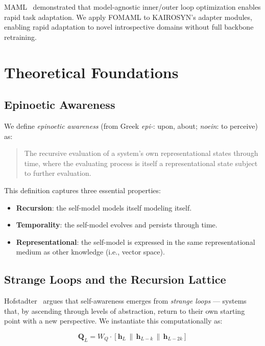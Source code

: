 \documentclass[conference]{IEEEtran}
\begin{document}
MAML~\cite{finn2017} demonstrated that model-agnostic inner/outer loop
optimization enables rapid task adaptation. We apply FOMAML to KAIROSYN's
adapter modules, enabling rapid adaptation to novel introspective domains
without full backbone retraining.


\section{Theoretical Foundations}

\subsection{Epinoetic Awareness}

We define \emph{epinoetic awareness} (from Greek \textit{epi-}: upon, about;
\textit{noein}: to perceive) as:

\begin{quote}
The recursive evaluation of a system's own representational states through
time, where the evaluating process is itself a representational state subject
to further evaluation.
\end{quote}

This definition captures three essential properties:
\begin{itemize}
  \item \textbf{Recursion}: the self-model models itself modeling itself.
  \item \textbf{Temporality}: the self-model evolves and persists through time.
  \item \textbf{Representational}: the self-model is expressed in the same
        representational medium as other knowledge (i.e., vector space).
\end{itemize}

\subsection{Strange Loops and the Recursion Lattice}

Hofstadter~\cite{hofstadter1979} argues that self-awareness emerges from
\emph{strange loops} --- systems that, by ascending through levels of
abstraction, return to their own starting point with a new perspective.
We instantiate this computationally as:

\begin{equation}
\mathbf{Q}_L = W_Q \cdot [\mathbf{h}_L \,\|\, \mathbf{h}_{L-k} \,\|\,
\mathbf{h}_{L-2k}]
\label{eq:strange_loop_query}
\end{equation}
\end{document}
